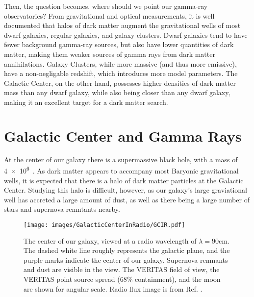   Then, the question becomes, where should we point our gamma-ray observatories?
  From gravitational and optical measurements, it is well documented that halos of dark matter augment the gravitational wells of most dwarf galaxies, regular galaxies, and galaxy clusters.
  Dwarf galaxies tend to have fewer background gamma-ray sources, but also have lower quantities of dark matter, making them weaker sources of gamma rays from dark matter annihilations.
  Galaxy Clusters, while more massive (and thus more emissive), have a non-negligable redshift, which introduces more model parameters.
  The Galactic Center, on the other hand, possesses higher densities of dark matter mass than any dwarf galaxy, while also being closer than any dwarf galaxy, making it an excellent target for a dark matter search.


\section{Galactic Center and Gamma Rays}

  At the center of our galaxy there is a supermassive black hole, with a mass of \SI{4e6}{\Msol{}}~\cite{sgra_massdist}.
  As dark matter appears to accompany most Baryonic gravitational wells, it is expected that there is a halo of dark matter particles at the Galactic Center.
  Studying this halo is difficult, however, as our galaxy's large graviational well has accreted a large amount of dust, as well as there being a large number of stars and supernova remntants nearby.

  \begin{figure}[ht]
    \centering
    \texttt{[image: images/GalacticCenterInRadio/GCIR.pdf]}
    \caption[Galactic Center in Radio]{
      The center of our galaxy, viewed at a radio wavelength of $\lambda=90\text{cm}$.
      The dashed white line roughly represents the galactic plane, and the purple marks indicate the center of our galaxy.
      Supernova remnants and dust are visible in the view.
      The VERITAS field of view, the VERITAS point source spread (68\% containment), and the moon are shown for angular scale.
      Radio flux image is from Ref. \cite{galactic_center_in_radio}.
      \CaptionBlankLine
    }
    \label{fig_gc_radio}
  \end{figure}

